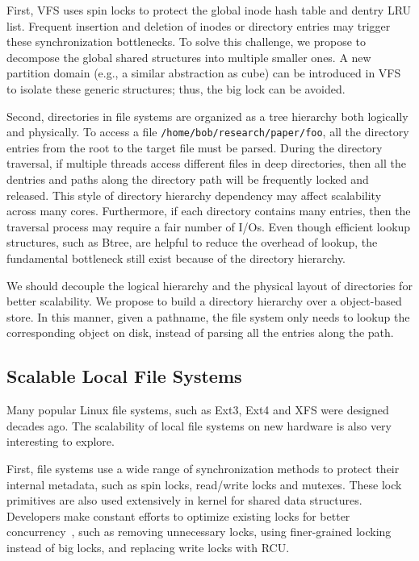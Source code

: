 First, VFS uses spin locks to protect the global
inode hash table and dentry LRU list.  Frequent insertion and deletion
of inodes or directory entries may trigger these synchronization
bottlenecks.  To solve this challenge, we propose to decompose the
global shared structures into multiple smaller ones.  A new partition
domain (e.g., a similar abstraction as cube) can be introduced in VFS
to isolate these generic structures; thus, the big lock can be avoided.  

Second, directories in file systems are organized as a tree
hierarchy both logically and physically.  To access a
file {\tt /home/bob/research/paper/foo}, all the directory entries
from the root to the target file must be parsed.  
During the directory traversal, if multiple threads access
different files in deep directories, then all the dentries and paths
along the directory path will be frequently locked and released.  This
style of directory hierarchy dependency may affect scalability across
many cores.  Furthermore, if each directory contains many entries,
then the traversal process may require a fair number of 
I/Os.  Even though efficient lookup structures, such as Btree, are
helpful to reduce the overhead of lookup, the fundamental bottleneck
still exist because of the directory hierarchy. 

We should decouple the logical hierarchy and the physical layout of
directories for better scalability.  We propose to build a directory
hierarchy over a object-based store.  In this manner, given a
pathname, the file system only needs to lookup the corresponding
object on disk, instead of parsing all the entries along the path.

\subsection{Scalable Local File Systems}

Many popular Linux file systems, such as Ext3, Ext4 and XFS were
designed decades ago. The scalability of local file systems on  
new hardware is also very interesting to explore. 

First, file systems use a wide range of synchronization methods to
protect their internal metadata, such as spin locks, read/write locks
and mutexes.  These lock primitives are also used extensively in
kernel for shared data structures.  Developers make constant efforts
to optimize existing locks for better
concurrency~\cite{LuEtAl13-fsstudy}, 
such as removing unnecessary locks, using finer-grained locking
instead of big locks, and replacing write locks with RCU.  

